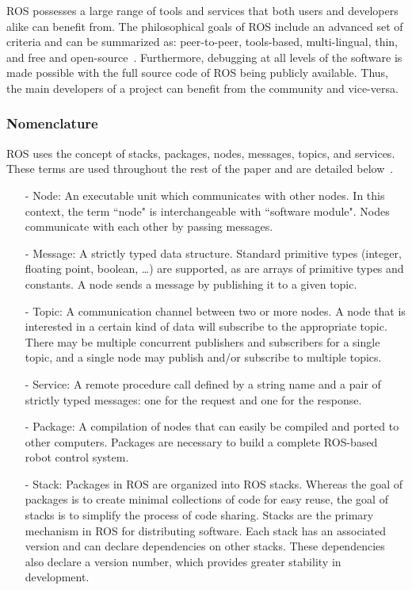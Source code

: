 ROS possesses a large range of tools and services that both users and developers alike can benefit from. The philosophical goals of ROS include an advanced set of criteria and can be summarized as: peer-to-peer, tools-based, multi-lingual, thin, and free and open-source~\cite{QUIGLEY.ICRA.2009}. Furthermore, debugging at all levels of the software is made possible with the full source code of ROS being publicly available. Thus, the main developers of a project can benefit from the community and vice-versa.

\subsubsection*{Nomenclature}

ROS uses the concept of stacks, packages, nodes, messages, topics, and services. These terms are used throughout the rest of the paper and are detailed below~\cite{QUIGLEY.ICRA.2009}.
\begin{itemize}
\item[-] Node: An executable unit which communicates with other nodes. In this context, the
term ``node" is interchangeable with ``software module". Nodes communicate with each other by passing messages.
\item[-] Message: A strictly typed data structure. Standard
primitive types (integer, floating point, boolean, \ldots) are
supported, as are arrays of primitive types and constants. A node sends a message by publishing it to a given topic.
\item[-] Topic: A communication channel between two or more
nodes. A node that is interested in a certain kind of data will subscribe
to the appropriate topic. There may be multiple concurrent
publishers and subscribers for a single topic, and a single
node may publish and/or subscribe to multiple topics.
\item[-] Service: A remote procedure call defined by a string name and a pair
of strictly typed messages: one for the request and one for
the response.
\item[-] Package: A compilation of nodes that can easily be compiled and ported to other computers. Packages are necessary to build a complete ROS-based robot control system.
\item[-] Stack: Packages in ROS are organized into ROS stacks. Whereas the goal of packages is to create minimal collections of code for easy reuse, the goal of stacks is to simplify the process of code sharing. Stacks are the primary mechanism in ROS for distributing software. Each stack has an associated version and can declare dependencies on other stacks. These dependencies also declare a version number, which provides greater stability in development.

\end{itemize} 